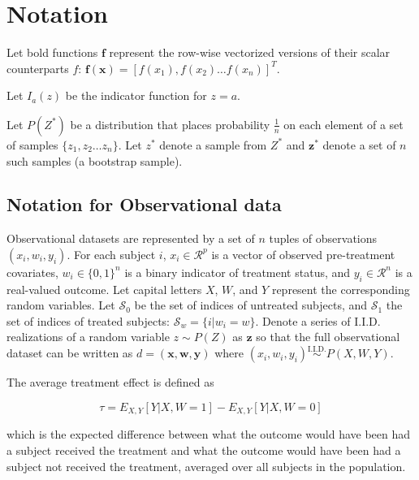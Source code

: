 \section{Notation}
\label{sec:notation}

Let bold functions $\mathbf{f}$ represent the row-wise vectorized versions of their scalar counterparts $f$: $\mathbf{f}(\mathbf{x}) = [f(x_1), f(x_2) \dots f(x_n)]^T$. 

Let $I_a(z)$ be the indicator function for $z=a$.

Let $P(Z^*)$ be a distribution that places probability $\frac{1}{n}$ on each element of  a set of samples $\{z_1, z_2 \dots z_n\}$. Let $z^*$ denote a sample from $Z^*$ and $\bm{z}^*$ denote a set of $n$ such samples (a bootstrap sample).

\subsection{Notation for Observational data}

Observational datasets are represented by a set of $n$ tuples of observations $(x_i,w_i,y_i)$. For each subject $i$, $x_i \in \mathcal{R}^{p}$ is a vector of observed pre-treatment covariates, $w_i \in \{0,1\}^n$ is a binary indicator of treatment status, and $y_i \in \mathcal{R}^n$ is a real-valued outcome. Let capital letters $X$, $W$, and $Y$ represent the corresponding random variables. Let $\mathcal{S}_0$ be the set of indices of untreated subjects, and $\mathcal{S}_1$ the set of indices of treated subjects: $\mathcal{S}_w = \{i | w_i = w\}$.  Denote a series of I.I.D. realizations of a random variable $z \sim P(Z)$ as $\bm{z}$ so that the full observational dataset can be written as $d = (\mathbf{x}, \mathbf{w}, \mathbf{y})$ where $(x_i,w_i,y_i) \overset{\text{I.I.D.}}{\sim} P(X,W,Y)$. 

The average treatment effect is defined as 

\begin{equation}
\tau = E_{X,Y}[Y|X,W=1] - E_{X,Y}[Y|X,W=0]
\label{eq:effect}
\end{equation}

which is the expected difference between what the outcome would have been had a subject received the treatment and what the outcome would have been had a subject not received the treatment, averaged over all subjects in the population. %